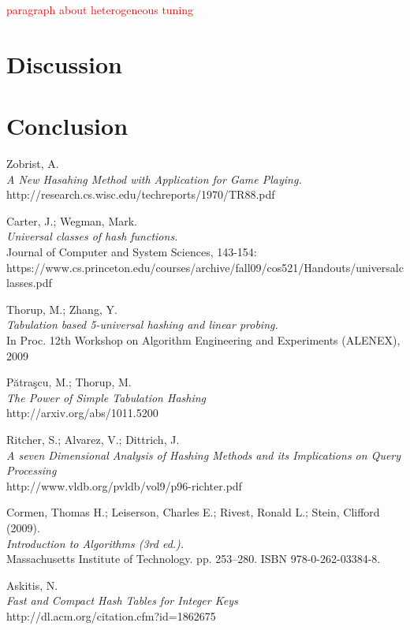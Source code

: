 \documentclass[11pt]{article} %
\begin{document}
\newpage
\textcolor{red}{paragraph about heterogeneous tuning}
\section{Discussion}
\newpage
\section{Conclusion}
\newpage



\begin{thebibliography}{99}

 Zobrist, A.\\
 \emph{A New Hasahing Method with Application for Game Playing.}\\
 http://research.cs.wisc.edu/techreports/1970/TR88.pdf

 Carter, J.; Wegman, Mark.\\
 \emph{Universal classes of hash functions.}\\
 Journal of Computer and System Sciences, 143-154:\\
 https://www.cs.princeton.edu/courses/archive/fall09/cos521/Handouts/universalclasses.pdf

 Thorup, M.; Zhang, Y.\\
 \emph{Tabulation based 5-universal hashing and linear probing.}\\
 In Proc. 12th Workshop on Algorithm Engineering and Experiments (ALENEX), 2009

 Pătraşcu, M.; Thorup, M.\\
 \emph{The Power of Simple Tabulation Hashing}\\
 http://arxiv.org/abs/1011.5200

 Ritcher, S.; Alvarez, V.; Dittrich, J.\\
 \emph{A seven Dimensional Analysis of Hashing Methods and its Implications on Query Processing}\\
 http://www.vldb.org/pvldb/vol9/p96-richter.pdf

 Cormen, Thomas H.; Leiserson, Charles E.; Rivest, Ronald L.; Stein, Clifford (2009). \\
 \emph{Introduction to Algorithms (3rd ed.).} \\
 Massachusetts Institute of Technology. pp. 253–280. ISBN 978-0-262-03384-8.

 Askitis, N.\\
 \emph{Fast and Compact Hash Tables for Integer Keys}\\
 http://dl.acm.org/citation.cfm?id=1862675


\end{thebibliography}
\end{document}
